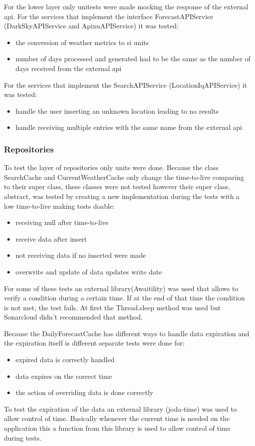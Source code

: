 \documentclass[12pt]{article}
\begin{document}
For the lower layer only unitests were made mocking the response of the external api. For the
  services that implement the interface ForecastAPIService (DarkSkyAPIService and
  ApixuAPIService) it was tested:
  \begin{itemize}
    \item the conversion of weather metrics to si units
    \item number of days processed and generated had to be the same as the number of days
      received from the external api
  \end{itemize}
  For the services that implement the SearchAPIService (LocationIqAPIService) it was tested:
  \begin{itemize}
    \item handle the user inserting an unknown location leading to no results
    \item handle receiving multiple entries with the same name from the external api
  \end{itemize}

\subsubsection{Repositories}

To test the layer of repositories only units were done. Because the class SearchCache and
  CurrentWeatherCache only change the time-to-live comparing to their super class, these classes were not tested however
  their super class, abstract, was tested by creating a new implementation during the tests with a low
  time-to-live making tests doable:
  \begin{itemize}
    \item receiving null after time-to-live
    \item receive data after insert
    \item not receiving data if no inserted were made
    \item overwrite and update of data updates write date
  \end{itemize}
  For some of these tests an external library(Awaitility) was used that allows to verify a condition
    during a certain time. If at the end of that time the condition is not met,
    the test fails. At first the Thread.sleep method was used but Sonarcloud didn't
    recommended that method.

Because the DailyForecastCache has different ways to handle data expiration and
  the expiration itself is different separate tests were done for:
  \begin{itemize}
    \item expired data is correctly handled
    \item data expires on the correct time
    \item the action of overriding data is done correctly
  \end{itemize}
  To test the expiration of the data an external library (joda-time) was used to allow
    control of time. Basically whenever the current time is needed on the application this
    a function from this library is used to allow control of time during tests.
\end{document}
